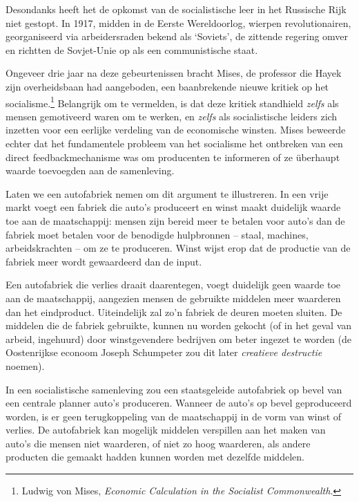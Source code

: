 \documentclass[
  a5paper,
  smalldemyvopaper,11pt,twoside,onecolumn,openright,extrafontsizes,
hidelinks]{memoir}
\begin{document}
Desondanks heeft het de opkomst van de socialistische leer in het
Russische Rijk niet gestopt. In 1917, midden in de Eerste Wereldoorlog,
wierpen revolutionairen, georganiseerd via arbeidersraden bekend als
`Soviets', de zittende regering omver en richtten de Sovjet-Unie op als
een communistische staat.

Ongeveer drie jaar na deze gebeurtenissen bracht Mises, de professor die
Hayek zijn overheidsbaan had aangeboden, een baanbrekende nieuwe kritiek
op het socialisme.\footnote{\hspace{0pt}Ludwig von Mises, \emph{Economic
  Calculation in the Socialist Commonwealth}.} Belangrijk om te
vermelden, is dat deze kritiek standhield \emph{zelfs} als mensen
gemotiveerd waren om te werken, en \emph{zelfs} als socialistische
leiders zich inzetten voor een eerlijke verdeling van de economische
winsten. Mises beweerde echter dat het fundamentele probleem van het
socialisme het ontbreken van een direct feedbackmechanisme was om
producenten te informeren of ze überhaupt waarde toevoegden aan de
samenleving.

Laten we een autofabriek nemen om dit argument te illustreren. In een
vrije markt voegt een fabriek die auto's produceert en winst maakt
duidelijk waarde toe aan de maatschappij: mensen zijn bereid meer te
betalen voor auto's dan de fabriek moet betalen voor de benodigde
hulpbronnen -- staal, machines, arbeidskrachten -- om ze te produceren.
Winst wijst erop dat de productie van de fabriek meer wordt gewaardeerd
dan de input.

Een autofabriek die verlies draait daarentegen, voegt duidelijk geen
waarde toe aan de maatschappij, aangezien mensen de gebruikte middelen
meer waarderen dan het eindproduct. Uiteindelijk zal zo'n fabriek de
deuren moeten sluiten. De middelen die de fabriek gebruikte, kunnen nu
worden gekocht (of in het geval van arbeid, ingehuurd) door
winstgevendere bedrijven om beter ingezet te worden (de Oostenrijkse
econoom Joseph Schumpeter zou dit later \emph{creatieve destructie}
noemen).

In een socialistische samenleving zou een staatsgeleide autofabriek op
bevel van een centrale planner auto's produceren. Wanneer de auto's op
bevel geproduceerd worden, is er geen terugkoppeling van de maatschappij
in de vorm van winst of verlies. De autofabriek kan mogelijk middelen
verspillen aan het maken van auto's die mensen niet waarderen, of niet
zo hoog waarderen, als andere producten die gemaakt hadden kunnen worden
met dezelfde middelen.
\end{document}
